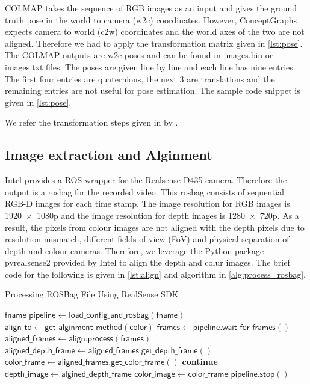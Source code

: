 COLMAP takes the sequence of RGB images as an input and gives the ground truth pose in the world to camera (w2c) coordinates. However, ConceptGraphs expects camera to world (c2w)
coordinates and the world axes of the two are not aligned. Therefore we had to apply the transformation matrix given in \cref{lst:pose}. The COLMAP outputs are w2c poses and can be found 
in images.bin or images.txt files. The poses are given line by line and each line has nine entries. The first four entries are quaternions, the next 3 are translations and the remaining entries are
not useful for pose estimation. The sample code snippet is given in \cref{lst:pose}.

We refer the transformation steps given in \cite{colmap2nerf} by \citet{mueller2022instant}. 

\subsection{Image extraction and Alginment}
Intel provides a ROS wrapper for the Realsense D435  camera. Therefore the output is a rosbag for the recorded video. This rosbag consists of sequential RGB-D images for each time
stamp. The image resolution for RGB images is 1920~$\times$~1080p and the image resolution for depth images is 1280~$\times$~720p. As a result, the pixels from colour images are not aligned with the depth pixels due to 
resolution mismatch, different fields of view (FoV) and physical separation of depth and colour cameras. Therefore, we leverage the Python package pyrealsense2 provided by Intel to align the depth and colur images. 
The brief code for the following is given in \cref{lst:align} and algorithm in \cref{alg:process_rosbag}.
\begin{Algorithmus}
  \caption{Processing ROSBag File Using RealSense SDK}
  \label{alg:process_rosbag}
  \begin{algorithmic}[1]
    \Require $\mathsf{fname}$ 
    \State $\mathsf{pipeline} \gets \mathsf{load\_config\_and\_rosbag(fname)}$ 
    \State $\mathsf{align\_to} \gets \mathsf{get\_alginment\_method(color)}$
      \State $\mathsf{frames} \gets \mathsf{pipeline.wait\_for\_frames()}$   
      \State $\mathsf{aligned\_frames} \gets \mathsf{align.process(frames)}$  
      \State $\mathsf{aligned\_depth\_frame} \gets \mathsf{aligned\_frames.get\_depth\_frame()}$ 
      \State $\mathsf{color\_frame} \gets \mathsf{aligned\_frames.get\_color\_frame()}$
        \State \textbf{continue}                            
      \EndIf
      \State $\mathsf{depth\_image} \gets \mathsf{algined\_depth\_frame}$
      \State $\mathsf{color\_image} \gets \mathsf{color\_frame}$
    \EndWhile
    \State $\mathsf{pipeline.stop()}$
  \end{algorithmic}
\end{Algorithmus}

